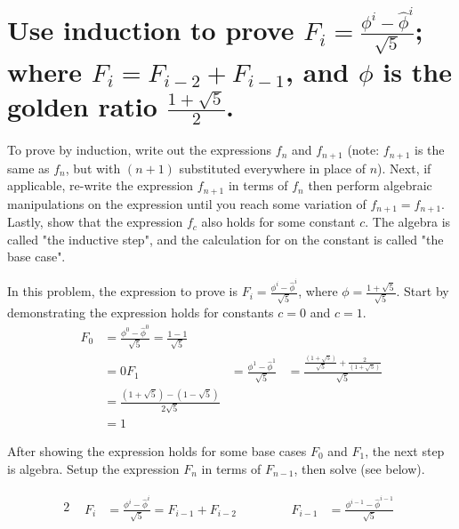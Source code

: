 \section[Problem 2]{Use induction to prove $F_i = \frac{\phi^i - \hat{\phi}^i}{\sqrt{5}}$; where $F_i = F_{i-2} + F_{i-1}$, and $\phi$ is the golden ratio $\frac{1 + \sqrt{5}}{2}$.}

To prove by induction, write out the expressions $f_n$ and $f_{n + 1}$ (note: $f_{n + 1}$ is the same as $f_n$, but with $(n + 1)$ substituted everywhere in place of $n$). Next, if applicable, re-write the expression $f_{n + 1}$ in terms of $f_n$ then perform algebraic manipulations on the expression until you reach some variation of $f_{n + 1} = f_{n + 1}$.  Lastly, show that the expression $f_c$ also holds for some constant $c$. The algebra is called "the inductive step", and the calculation for on the constant is called "the base case".

In this problem, the expression to prove is $F_i = \frac{\phi^i - \hat{\phi}^i}{\sqrt{5}}$, where $\phi = \frac{1 + \sqrt{5}}{\sqrt{5}}$. Start by demonstrating the expression holds for constants $c = 0$ and $c = 1$.
\begin{align*}
	F_0 &= \frac{\phi^0 - \hat{\phi}^0}{\sqrt{5}} = \frac{1 - 1}{\sqrt{5}} \\
		&= 0 
	F_1 &= \frac{\phi^1 - \hat{\phi}^1}{\sqrt{5}} &= \frac{\frac{\left( 1 + \sqrt{5} \right)}{\sqrt{5}} + \frac{2}{\left( 1 + \sqrt{5} \right)}}{\sqrt{5}} \\
	&= 
	\frac{\left( 1 + \sqrt{5} \right) - \left( 1 - \sqrt{5} \right)}{2 \sqrt{5}} \\
	&=
	1
\end{align*}

After showing the expression holds for some base cases $F_0$ and $F_1$, the next step is algebra. Setup the expression $F_n$ in terms of $F_{n - 1}$, then solve (see below). 

\setcounter{equation}{0}
\begin{alignat*}{2}
	&
	\begin{aligned}
		F_i &= \frac{\phi^i - \hat{\phi}^i}{\sqrt{5}} = F_{i - 1} + F_{i - 2}
	\end{aligned}
	& \qquad &
	\begin{aligned}
		F_{i - 1} &= \frac{\phi^{i - 1} - \hat{\phi}^{i - 1}}{\sqrt{5}}
	\end{aligned}
\end{alignat*}

